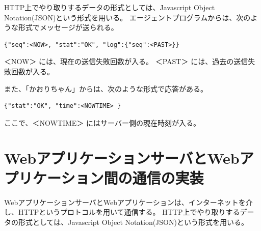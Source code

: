 HTTP上でやり取りするデータの形式としては、Javascript Object Notation(JSON)という形式を用いる。
エージェントプログラムからは、次のような形式でメッセージが送られる。
\begin{lstlisting}[caption=エージェントプログラムから「かおりちゃん」に送られるメッセージの書式,label=format1]
{"seq":<NOW>, "stat":"OK", "log":{"seq":<PAST>}}
\end{lstlisting}
＜NOW＞ には、現在の送信失敗回数が入る。
＜PAST＞ には、過去の送信失敗回数が入る。


また、「かおりちゃん」からは、次のような形式で応答がある。
\begin{lstlisting}[caption=「かおりちゃん」からエージェントプログラムへの応答の形式,label=format2]
{"stat":"OK", "time":<NOWTIME> }
\end{lstlisting}
ここで、＜NOWTIME＞ にはサーバー側の現在時刻が入る。


\section{WebアプリケーションサーバとWebアプリケーション間の通信の実装}
WebアプリケーションサーバとWebアプリケーションは、インターネットを介し、HTTPというプロトコルを用いて通信する。
HTTP上でやり取りするデータの形式としては、Javascript Object Notation(JSON)という形式を用いる。

